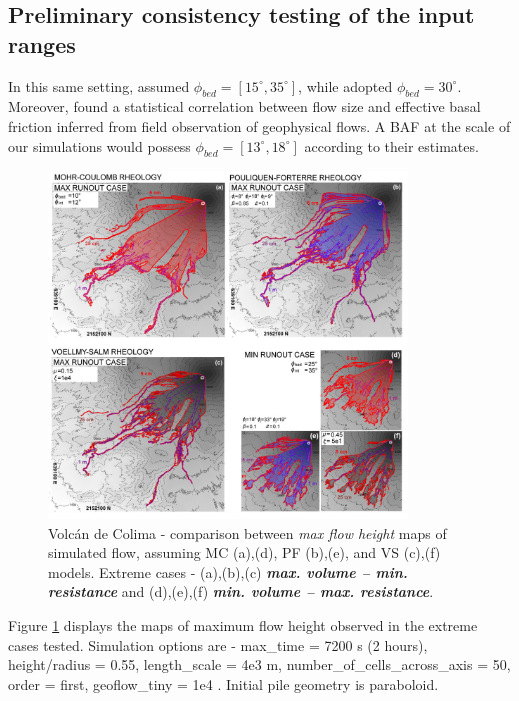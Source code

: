 \documentclass{article}
\begin{document}
\subsection{Preliminary consistency testing of the input ranges}
In this same setting, \cite{Dalbey2008} assumed $\phi_{bed}=[15^\mathrm{\circ}, 35^\mathrm{\circ}]$, while \citep{Capra2011} adopted $\phi_{bed}=30^\mathrm{\circ}$. Moreover, \cite{Spiller2014,Bayarri2015,Ogburn2016} found a statistical correlation between flow size and effective basal friction inferred from field observation of geophysical flows. A BAF at the scale of our simulations would possess $\phi_{bed}=[13^\mathrm{\circ}, 18^\mathrm{\circ}]$ according to their estimates.
\begin{figure}[H]
         \centering
        \includegraphics[width=0.85\textwidth]{Figures/ExtremeMaps.jpg}
        \caption{Volc\'an de Colima - comparison between \emph{max flow height} maps of simulated flow, assuming MC (a),(d), PF (b),(e), and VS (c),(f) models. Extreme cases - (a),(b),(c) \emph{\textbf{max. volume -- min. resistance}} and (d),(e),(f) \emph{\textbf{min. volume -- max. resistance}}.}
        \label{Colima-MaxMinExtents}
\end{figure}
Figure \ref{Colima-MaxMinExtents} displays the maps of maximum flow height observed in the extreme cases tested. Simulation options are - max\_time = 7200 s (2 hours), height/radius = 0.55, length\_scale = 4e3 m, number\_of\_cells\_across\_axis = 50, order = first, geoflow\_tiny = 1e4 \citep{Patra2005,Aghakhani2016}. Initial pile geometry is paraboloid.
\end{document}
